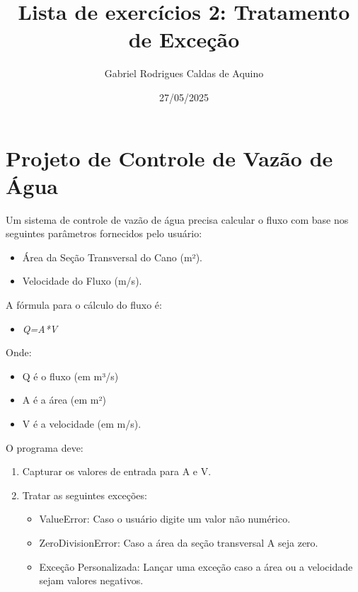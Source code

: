 \title{Lista de exercícios 2: Tratamento de Exceção}
\author{Gabriel Rodrigues Caldas de Aquino}
\date{27/05/2025}



\maketitle

\section{Projeto de Controle de Vazão de Água}

Um sistema de controle de vazão de água precisa calcular o fluxo com base nos seguintes parâmetros fornecidos pelo usuário:

\begin{itemize}
    \item Área da Seção Transversal do Cano (m²).
    \item Velocidade do Fluxo (m/s).
\end{itemize}

A fórmula para o cálculo do fluxo é:

\begin{itemize}
    \item \textit{Q=A*V}
\end{itemize}


Onde: \begin{itemize}
    \item Q é o fluxo (em m³/s)
    \item A é a área (em m²)
    \item V é a velocidade (em m/s).
\end{itemize} 
O programa deve:
\begin{enumerate}
    \item Capturar os valores de entrada para A e V.
    \item Tratar as seguintes exceções:
    \begin{itemize}
        \item ValueError: Caso o usuário digite um valor não numérico.
        \item ZeroDivisionError: Caso a área da seção transversal A seja zero.
        \item Exceção Personalizada: Lançar uma exceção caso a área ou a velocidade sejam valores negativos.
    \end{itemize}
\end{enumerate}



